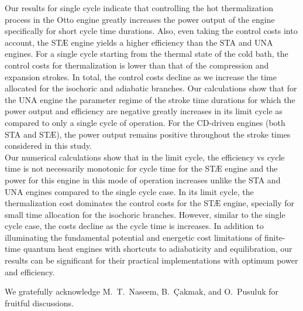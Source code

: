 \documentclass[aps,pra,twocolumn,showpacs,showkeys,groupedaddress,nobalancelastpage,nofootinbib,floatfix,superscriptaddress,longbibliography]{revtex4-2}
\begin{document}
Our results for single cycle indicate that controlling the hot thermalization process in the Otto engine greatly increases the power output of the engine specifically for short cycle time durations. Also, even taking the control costs into account, the ST{\AE} engine yields a higher efficiency than the STA and UNA engines. For a single cycle starting from the thermal state of the cold bath, the control costs for thermalization is lower than that of the compression and expansion strokes. In total, the control costs decline as we increase the time allocated for the isochoric and adiabatic branches. Our calculations show that for the UNA engine the parameter regime of the stroke time durations for which the power output and efficiency are negative greatly increases in its limit cycle as compared to only a single cycle of operation. For the CD-driven engines (both STA and ST{\AE}), the power output remains positive throughout the stroke times considered in this study.\\

Our numerical calculations show that in the limit cycle, the efficiency vs cycle time is not necessarily monotonic for cycle time for the ST{\AE}
engine and the power for this engine in this mode of operation increases unlike the STA and UNA engines compared to the single cycle case. In its limit cycle, the thermalization cost dominates the control costs for the ST{\AE} engine, specially for small time allocation for the isochoric branches. However, similar to the single cycle case, the costs decline as the cycle time is increases. In addition to illuminating the fundamental potential and energetic cost limitations of finite-time quantum heat engines with shortcuts to adiabaticity and equilibration, our results can be significant for their practical implementations with optimum power and efficiency.

\acknowledgements

We gratefully acknowledge M.~T.~Naseem, B.~Çakmak, and O.~Pusuluk for fruitful discussions.

\nocite{*}
%
%

\end{document}
